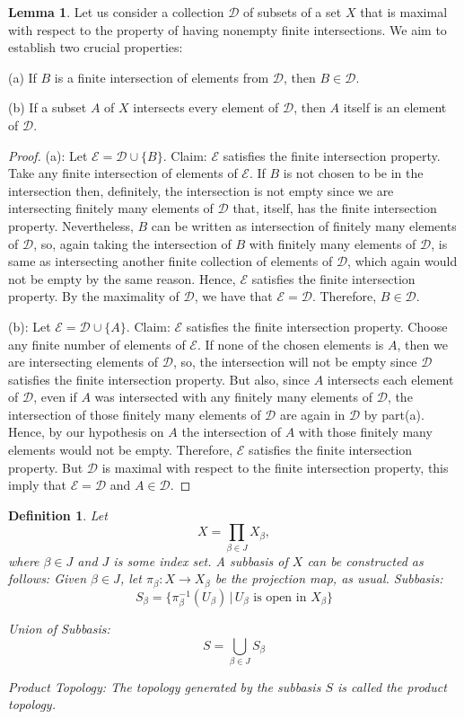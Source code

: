 \documentclass{article}
\newtheorem{definition}{Definition}[subsection]
\theoremstyle{definition}
\newtheorem{lemma}{Lemma}
\begin{document}
\begin{lemma}
    Let us consider a collection $\mathcal{D}$ of subsets of a set $X$ that is maximal with respect to the property of having nonempty finite intersections. We aim to establish two crucial properties:

(a) If $B$ is a finite intersection of elements from $\mathcal{D}$, then $B \in \mathcal{D}$.

(b) If a subset $A$ of $X$ intersects every element of $\mathcal{D}$, then $A$ itself is an element of $\mathcal{D}$.

\end{lemma}


\begin{proof}
    (a): Let $\mathcal{E} = \mathcal{D} \cup \{B\}$. Claim: $\mathcal{E}$ satisfies the finite intersection property. Take any finite intersection of elements of $\mathcal{E}$. If $B$ is not chosen to be in the intersection then, definitely, the intersection is not empty since we are intersecting finitely many elements of $\mathcal{D}$ that, itself, has the finite intersection property. Nevertheless, $B$ can be written as intersection of finitely many elements of $\mathcal{D}$, so, again taking the intersection of $B$ with finitely many elements of $\mathcal{D}$, is same as intersecting another finite collection of elements of $\mathcal{D}$, which again would not be empty by the same reason. Hence, $\mathcal{E}$ satisfies the finite intersection property. By the maximality of $\mathcal{D}$, we have that $\mathcal{E} = \mathcal{D}$. Therefore, $B \in \mathcal{D}$.

(b): Let $\mathcal{E} = \mathcal{D} \cup \{A\}$. Claim: $\mathcal{E}$ satisfies the finite intersection property. Choose any finite number of elements of $\mathcal{E}$. If none of the chosen elements is $A$, then we are intersecting elements of $\mathcal{D}$, so, the intersection will not be empty since $\mathcal{D}$ satisfies the finite intersection property. But also, since $A$ intersects each element of $\mathcal{D}$, even if $A$ was intersected with any finitely many elements of $\mathcal{D}$, the intersection of those finitely many elements of $\mathcal{D}$ are again in $\mathcal{D}$ by part(a). Hence, by our hypothesis on $A$ the intersection of $A$ with those finitely many elements would not be empty. Therefore, $\mathcal{E}$ satisfies the finite intersection property. But $\mathcal{D}$ is maximal with respect to the finite intersection property, this imply that $\mathcal{E} = \mathcal{D}$ and $A \in \mathcal{D}$.
\end{proof}
\begin{definition}
    Let \[
X = \prod_{\beta \in J} X_\beta,
\]
where $\beta \in J$ and $J$ is some index set. A subbasis of $X$ can be constructed as follows:
Given $\beta \in J$, let $\pi_\beta: X \rightarrow X_\beta$ be the projection map, as usual.
Subbasis:
\[ S_\beta = \{ \pi_\beta^{-1}(U_\beta) \,|\, U_\beta \text{ is open in } X_\beta \} \]

Union of Subbasis:
\[ S = \bigcup_{\beta \in J} S_\beta \]

Product Topology:
The topology generated by the subbasis \( S \) is called the product topology.
\end{definition}
\end{document}
